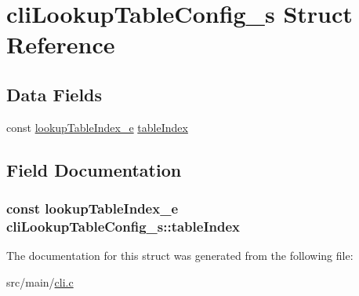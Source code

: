 \hypertarget{structcliLookupTableConfig__s}{\section{cli\+Lookup\+Table\+Config\+\_\+s Struct Reference}
\label{structcliLookupTableConfig__s}
}
\subsection*{Data Fields}
\begin{DoxyCompactItemize}
\item 
const \hyperlink{group__cli_gac274d9620d16de9b42d0ade183490fc0}{lookup\+Table\+Index\+\_\+e} \hyperlink{structcliLookupTableConfig__s_a74bab0d021111b1237756bcaf8e921c2}{table\+Index}
\end{DoxyCompactItemize}


\subsection{Field Documentation}
\hypertarget{structcliLookupTableConfig__s_a74bab0d021111b1237756bcaf8e921c2}{
\subsubsection[{table\+Index}]{\setlength{\rightskip}{0pt plus 5cm}const {\bf lookup\+Table\+Index\+\_\+e} cli\+Lookup\+Table\+Config\+\_\+s\+::table\+Index}}\label{structcliLookupTableConfig__s_a74bab0d021111b1237756bcaf8e921c2}


The documentation for this struct was generated from the following file\+:\begin{DoxyCompactItemize}
\item 
src/main/\hyperlink{cli_8c}{cli.\+c}\end{DoxyCompactItemize}
